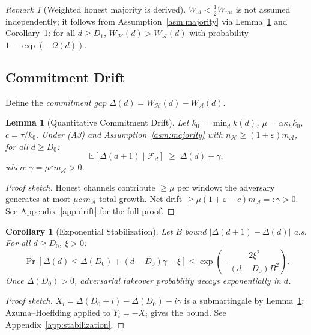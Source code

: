 \documentclass[10pt,journal,twoside]{IEEEtran}
\newtheorem{lemma}[theorem]{Lemma}
\newtheorem{corollary}[theorem]{Corollary}
\theoremstyle{remark}
\newtheorem{remark}{Remark}[section]
\begin{document}
	\begin{remark}[Weighted honest majority is derived]
		\label{rem:a2-derived}
		$W_{\mathcal{A}} < \tfrac{1}{2}W_{\mathrm{tot}}$ is
		not assumed independently; it follows from
		Assumption~\ref{asm:majority} via
		Lemma~\ref{lem:drift} and
		Corollary~\ref{cor:stabilization}: for all $d \geq D_1$,
		$W_{\mathcal{H}}(d) > W_{\mathcal{A}}(d)$ with
		probability $1 - \exp(-\Omega(d))$.
	\end{remark}
	
	\subsection{Commitment Drift}
	\label{ssec:drift}
	
	Define the \emph{commitment gap}
	$\Delta(d) = W_{\mathcal{H}}(d) - W_{\mathcal{A}}(d)$.
	
	\begin{lemma}[Quantitative Commitment Drift]
		\label{lem:drift}
		Let $k_0 = \min_d k(d)$, $\mu = \alpha\kappa_h k_0$,
		$c = \tau/k_0$.
		Under (A3) and Assumption~\ref{asm:majority} with
		$n_{\mathcal{H}} \geq (1+\varepsilon)m_{\mathcal{A}}$,
		for all $d \geq D_0$:
		\[
		\mathbb{E}[\Delta(d+1) \mid \mathcal{F}_d]
		\;\geq\; \Delta(d) + \gamma,
		\]
		where $\gamma = \mu\varepsilon m_{\mathcal{A}} > 0$.
	\end{lemma}
	
	\begin{proof}[Proof sketch]
		Honest channels contribute $\geq \mu$ per window;
		the adversary generates at most $\mu c\,m_{\mathcal{A}}$
		total growth.
		Net drift $\geq \mu(1+\varepsilon-c)m_{\mathcal{A}}
		=: \gamma > 0$.
		See Appendix~\ref{app:drift} for the full proof.
	\end{proof}
	
	\begin{corollary}[Exponential Stabilization]
		\label{cor:stabilization}
		Let $B$ bound $|\Delta(d{+}1)-\Delta(d)|$ a.s.
		For all $d \geq D_0$, $\xi > 0$:
		\[
		\Pr\!\left[\Delta(d) \leq \Delta(D_0)
		+ (d{-}D_0)\gamma - \xi\right]
		\leq \exp\!\left(-\frac{2\xi^2}{(d{-}D_0)B^2}\right).
		\]
		Once $\Delta(D_0) > 0$, adversarial takeover probability
		decays exponentially in $d$.
	\end{corollary}
	
	\begin{proof}[Proof sketch]
		$X_i = \Delta(D_0{+}i)-\Delta(D_0)-i\gamma$ is a
		submartingale by Lemma~\ref{lem:drift};
		Azuma--Hoeffding applied to $Y_i=-X_i$ gives the bound.
		See Appendix~\ref{app:stabilization}.
	\end{proof}
	
\end{document}
